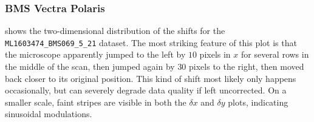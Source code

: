 \documentclass{article}
\begin{document}
\subsubsection{BMS Vectra Polaris}
\label{sec:BMS2D}

 shows the two-dimensional distribution of the shifts for the \texttt{ML1603474\_BMS069\_5\_21} dataset.  The most striking feature of this plot is that the microscope apparently jumped to the left by $10$ pixels in $x$ for several rows in the middle of the scan, then jumped again by $30$ pixels to the right, then moved back closer to its original position.  This kind of shift most likely only happens occasionally, but can severely degrade data quality if left uncorrected.  On a smaller scale, faint stripes are visible in both the $\delta x$ and $\delta y$ plots, indicating sinusoidal modulations.

\end{document}
